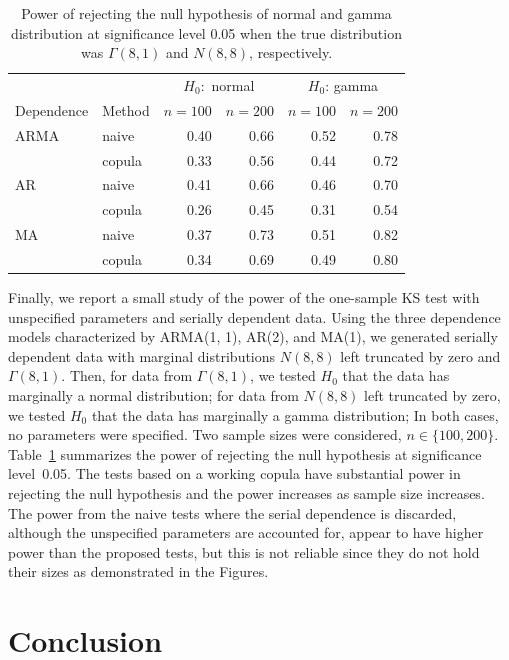 \documentclass[12pt, letterpaper, titlepage]{article}
\begin{document}
\begin{table}[ht]
  \label{tab:power}
  \caption{Power of rejecting the null hypothesis of normal and gamma
    distribution at significance level 0.05 when the true distribution was
    $\Gamma(8, 1)$ and $N(8, 8)$, respectively. }
\centering
\begin{tabular}{llrrrr}
  \toprule
  &  & \multicolumn{2}{c}{$H_0:$ normal} &
  \multicolumn{2}{c}{$H_0$: gamma}\\
  \cmidrule(lr){3-4}\cmidrule(lr){5-6}
  Dependence & Method & $n = 100$ & $n = 200$ & $n = 100$ & $n = 200$\\
  \midrule
ARMA & naive & 0.40 & 0.66 & 0.52 & 0.78 \\ 
   & copula & 0.33 & 0.56 & 0.44 & 0.72 \\ 
  AR & naive & 0.41 & 0.66 & 0.46 & 0.70 \\ 
   & copula & 0.26 & 0.45 & 0.31 & 0.54 \\ 
  MA & naive & 0.37 & 0.73 & 0.51 & 0.82 \\ 
   & copula & 0.34 & 0.69 & 0.49 & 0.80 \\ 
   \bottomrule
\end{tabular}
\end{table}

Finally, we report a small study of the power of the one-sample KS test with
unspecified parameters and serially dependent data. Using the three dependence
models characterized by ARMA(1, 1), AR(2), and MA(1), we generated serially
dependent data with marginal distributions $N(8, 8)$ left truncated by zero and
$\Gamma(8, 1)$. Then, for data from $\Gamma(8, 1)$, we tested $H_0$ that the
data has marginally a normal distribution; for data from $N(8, 8)$ left
truncated by zero, we tested $H_0$ that the data has marginally a gamma
distribution;  In both cases, no parameters were specified. Two sample sizes
were considered, $n \in \{100, 200\}$. Table~\ref{tab:power} summarizes the
power of rejecting the null hypothesis at significance level~0.05. The tests
based on a working copula have substantial power in rejecting the null
hypothesis and the power increases as sample size increases. The power from the
naive tests where the serial dependence is discarded, although the unspecified
parameters are accounted for, appear to have higher power than the proposed
tests, but this is not reliable since they do not hold their sizes as
demonstrated in the Figures. 

\section{Conclusion}
\label{sec:conclusion}
\end{document}
